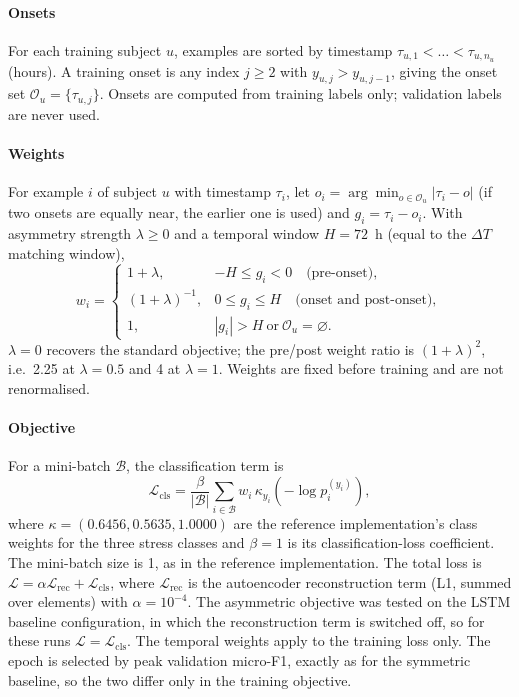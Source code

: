 \documentclass[preprint,12pt,authoryear]{elsarticle}
\newcommand{\dt}{$\Delta T$}
\begin{document}
\paragraph{Onsets} For each training subject $u$, examples are sorted
by timestamp $\tau_{u,1} < \dots < \tau_{u,n_u}$ (hours). A training
onset is any index $j \ge 2$ with $y_{u,j} > y_{u,j-1}$, giving the
onset set $\mathcal{O}_u = \{\tau_{u,j}\}$. Onsets are computed from
training labels only; validation labels are never used.

\paragraph{Weights} For example $i$ of subject $u$ with timestamp
$\tau_i$, let $o_i = \arg\min_{o \in \mathcal{O}_u} |\tau_i - o|$ (if
two onsets are equally near, the earlier one is used) and
$g_i = \tau_i - o_i$. With asymmetry strength $\lambda \ge 0$ and a
temporal window $H = 72$~h (equal to the \dt{} matching window),
\begin{equation}
w_i =
\begin{cases}
1 + \lambda, & -H \le g_i < 0 \quad \text{(pre-onset)},\\
(1 + \lambda)^{-1}, & 0 \le g_i \le H \quad \text{(onset and post-onset)},\\
1, & |g_i| > H \ \text{or}\ \mathcal{O}_u = \varnothing .
\end{cases}
\label{eq:asymw}
\end{equation}
$\lambda = 0$ recovers the standard objective; the pre/post weight
ratio is $(1+\lambda)^2$, i.e.\ 2.25 at $\lambda = 0.5$ and 4 at
$\lambda = 1$. Weights are fixed before training and are not
renormalised.

\paragraph{Objective} For a mini-batch $\mathcal{B}$, the
classification term is
\begin{equation}
\mathcal{L}_{\mathrm{cls}} = \frac{\beta}{|\mathcal{B}|}
\sum_{i \in \mathcal{B}} w_i \, \kappa_{y_i}
\left(-\log p_i^{(y_i)}\right),
\label{eq:asymloss}
\end{equation}
where $\kappa = (0.6456, 0.5635, 1.0000)$ are the reference
implementation's class weights for the three stress classes and
$\beta = 1$ is its classification-loss coefficient. The mini-batch size
is 1, as in the reference implementation. The total loss is
$\mathcal{L} = \alpha \mathcal{L}_{\mathrm{rec}} + \mathcal{L}_{\mathrm{cls}}$,
where $\mathcal{L}_{\mathrm{rec}}$ is the autoencoder reconstruction
term (L1, summed over elements) with $\alpha = 10^{-4}$. The asymmetric
objective was tested on the LSTM baseline configuration, in which the
reconstruction term is switched off, so for these runs
$\mathcal{L} = \mathcal{L}_{\mathrm{cls}}$. The temporal weights apply
to the training loss only. The epoch is selected by peak validation
micro-F1, exactly as for the symmetric baseline, so the two differ only
in the training objective.
\end{document}
